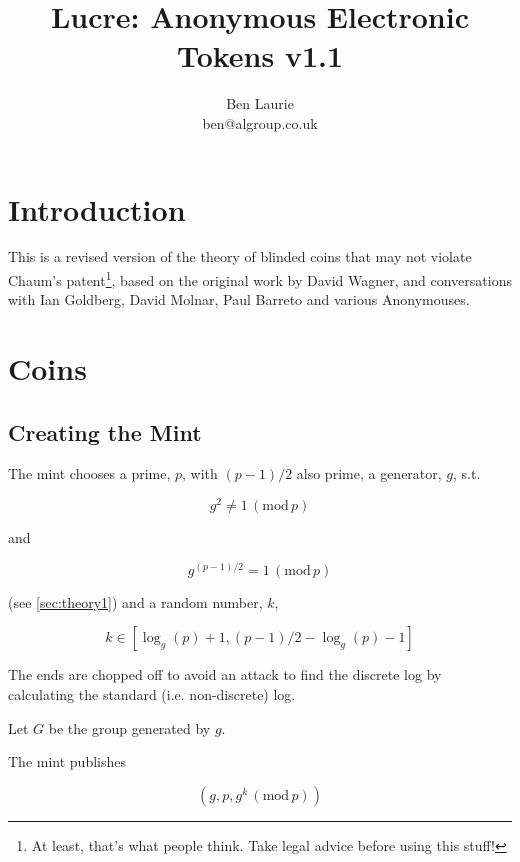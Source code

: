 \documentclass[a4paper,titlepage]{article}
\title{Lucre: Anonymous Electronic Tokens v1.1}
\author{Ben Laurie \\
ben@algroup.co.uk}
\begin{document}
\maketitle

\def\mod#1{\,(\textrm{mod}\,#1)}
\def\implies{\Rightarrow}
\def\qe#1{\begin{equation}#1\end{equation}}
\def\qearray#1{\begin{eqnarray}#1\end{eqnarray}}
\def\oneway#1{\textrm{oneway}(#1)}
\def\preoneway#1{\textrm{preoneway}(#1)}

\setlength{\parindent}{0pt}
\setlength{\parskip}{1ex plus 0.5ex minus 0.2ex}

\section{Introduction}

This is a revised version of the theory of blinded coins that may not
violate Chaum's patent\footnote{At least, that's what people
think. Take legal advice before using this stuff!}, based on the
original work by David Wagner, and conversations with Ian Goldberg,
David Molnar, Paul Barreto and various Anonymouses.

\section{Coins}

\subsection{Creating the Mint}

The mint chooses a prime, $p$, with $(p-1)/2$ also prime, a generator,
$g$, s.t.

\qe{g^2 \neq 1 \mod p}

and

\qe{\label{eq:1}g^{(p-1)/2} = 1 \mod p}

(see \ref{sec:theory1}) and a random number, $k$,

\qe{k \in [\log_g(p)+1,(p-1)/2-\log_g(p)-1]}

The ends are chopped off to avoid an attack to find the discrete log
by calculating the standard (i.e. non-discrete) log.

Let $G$ be the group generated by $g$.

The mint publishes

\qe{(g,p,g^k \mod p)}
\end{document}
